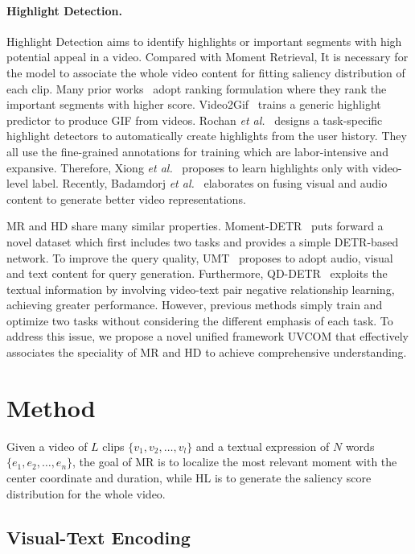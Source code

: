 \vspace{-10pt} 
\paragraph{Highlight Detection.} Highlight Detection aims to identify highlights or important segments with high potential appeal in a video. Compared with Moment Retrieval, It is necessary for the model to associate the whole video content for fitting saliency distribution of each clip. Many prior works~\cite{Yao_2016, video2gif, Yao_2016, LIM-s, cvs} adopt ranking formulation where they rank the important segments with higher score. Video2Gif~\cite{video2gif} trains a generic highlight predictor to produce GIF from videos. Rochan \textit{et al.}~\cite{Rochan_2020} designs a task-specific highlight detectors to automatically create highlights from the user history. They all use the fine-grained annotations for training which are labor-intensive and expansive. Therefore, Xiong \textit{et al.}~\cite{LIM-s} proposes to learn highlights only with video-level label. Recently, Badamdorj \textit{et al.}~\cite{joint_va} elaborates on fusing visual and audio content to generate better video representations.

MR and HD share many similar properties. Moment-DETR~\cite{momentdetr} puts forward a novel dataset which first includes two tasks and provides a simple DETR-based~\cite{detr} network. To improve the query quality, UMT~\cite{umt} proposes to adopt audio, visual and text content for query generation. Furthermore, QD-DETR~\cite{qddetr} exploits the textual information by involving video-text pair negative relationship learning, achieving greater performance. However, previous methods simply train and optimize two tasks without considering the different emphasis of each task. To address this issue, we propose a novel unified framework UVCOM that effectively associates the speciality of MR and HD to achieve comprehensive understanding. 
\section{Method}

Given a video of $L$ clips $\{v_1, v_2, \dots, v_l\}$ and a textual expression of $N$ words $\{e_1, e_2, \dots, e_n\}$, the goal of MR is to localize the most relevant moment with the center coordinate and duration, while HL is to generate the saliency score distribution for the whole video.

\subsection{Visual-Text Encoding}
\label{sec:visual-text encoding}
